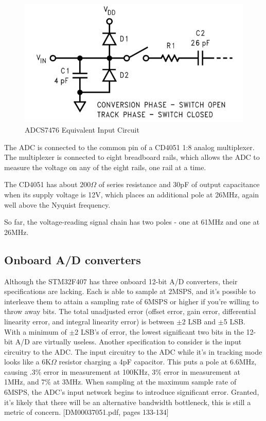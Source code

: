\documentclass[11pt,twoside]{mitthesis}
\begin{document}
\begin{figure}[h!]
  \begin{center}
      \includegraphics[width=.5\textwidth]{../adc-input-equiv.png}
      \caption{ADCS7476 Equivalent Input Circuit}
  \end{center}
\end{figure}


The ADC is connected to the common pin of a CD4051 1:8 analog multiplexer.
The multiplexer is connected to eight breadboard rails, which allows the ADC to measure the voltage on any of the eight rails, one rail at a time.

The CD4051 has about $200\Omega$ of series resistance and 30pF of output capacitance when its supply voltage is 12V, which places an additional pole at 26MHz, again well above the Nyquist frequency.

So far, the voltage-reading signal chain has two poles - one at 61MHz and one at 26MHz.

\subsection{Onboard A/D converters}
Although the STM32F407 has three onboard 12-bit A/D converters, their specifications are lacking.
Each is able to sample at 2MSPS, and it's possible to interleave them to attain a sampling rate of 6MSPS or higher if you're willing to throw away bits.
The total unadjusted error (offset error, gain error, differential linearity error, and integral linearity error) is between $\pm$2 LSB and $\pm$5 LSB.
With a minimum of $\pm$2 LSB's of error, the lowest significant two bits in the 12-bit A/D are virtually useless.
Another specification to consider is the input circuitry to the ADC.
The input circuitry to the ADC while it's in tracking mode looks like a 6K$\Omega$ resistor charging a 4pF capacitor.
This puts a pole at 6.6MHz, causing .3\% error in measurement at 100KHz, 3\% error in measurement at 1MHz, and 7\% at 3MHz.
When sampling at the maximum sample rate of 6MSPS, the ADC's input network begins to introduce significant error.
Granted, it's likely that there will be an alternative bandwidth bottleneck, this is still a metric of concern.
[DM00037051.pdf, pages 133-134]
\end{document}
